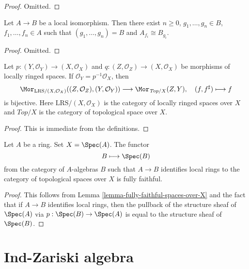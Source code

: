 \begin{proof}
Omitted.
\end{proof}

\begin{lemma}
\label{lemma-structure-local-isomorphism}
Let $A \to B$ be a local isomorphism. Then there exist $n \geq 0$,
$g_1, \ldots, g_n \in B$, $f_1, \ldots, f_n \in A$ such that
$(g_1, \ldots, g_n) = B$ and $A_{f_i} \cong B_{g_i}$.
\end{lemma}

\begin{proof}
Omitted.
\end{proof}

\begin{lemma}
\label{lemma-fully-faithful-spaces-over-X}
Let $p : (Y, \mathcal{O}_Y) \to (X, \mathcal{O}_X)$ and
$q : (Z, \mathcal{O}_Z) \to (X, \mathcal{O}_X)$
be morphisms of locally ringed spaces.
If $\mathcal{O}_Y = p^{-1}\mathcal{O}_X$, then
$$
\Mor_{\text{LRS}/(X, \mathcal{O}_X)}((Z, \mathcal{O}_Z), (Y, \mathcal{O}_Y))
\longrightarrow
\Mor_{\textit{Top}/X}(Z, Y),\quad
(f, f^\sharp) \longmapsto f
$$
is bijective. Here $\text{LRS}/(X, \mathcal{O}_X)$ is the category of
locally ringed spaces over $X$ and $\textit{Top}/X$ is the category
of topological space over $X$.
\end{lemma}

\begin{proof}
This is immediate from the definitions.
\end{proof}

\begin{lemma}
\label{lemma-local-isomorphism-fully-faithful}
Let $A$ be a ring. Set $X = \Spec(A)$. The functor
$$
B \longmapsto \Spec(B)
$$
from the category of $A$-algebras $B$ such that $A \to B$ identifies
local rings to the category of
topological spaces over $X$ is fully faithful.
\end{lemma}

\begin{proof}
This follows from Lemma \ref{lemma-fully-faithful-spaces-over-X}
and the fact that if $A \to B$ identifies local rings, then the pullback
of the structure sheaf of $\Spec(A)$ via $p : \Spec(B) \to \Spec(A)$
is equal to the structure sheaf of $\Spec(B)$.
\end{proof}




\section{Ind-Zariski algebra}
\label{section-ind-zariski}

